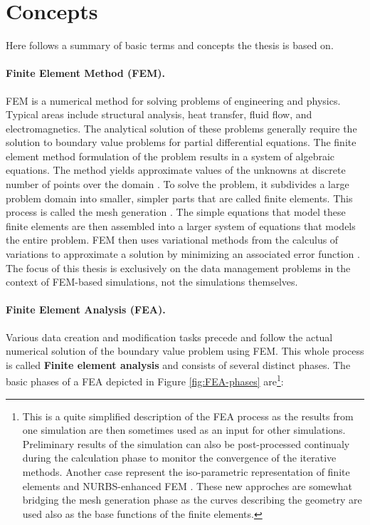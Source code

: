 \section{Concepts}

Here follows a summary of basic terms and concepts the thesis is based on.

\paragraph{Finite Element Method (FEM).} FEM is a numerical method for solving problems of engineering and physics. Typical areas include structural analysis, heat transfer, fluid flow, and electromagnetics. The analytical solution of these problems generally require the solution to boundary value problems for partial differential equations. The finite element method formulation of the problem results in a system of algebraic equations. The method yields approximate values of the unknowns at discrete number of points over the domain \cite{XXX}. To solve the problem, it subdivides a large problem domain into smaller, simpler parts that are called finite elements. This process is called the mesh generation \cite{XXX}. The simple equations that model these finite elements are then assembled into a larger system of equations that models the entire problem. FEM then uses variational methods from the calculus of variations to approximate a solution by minimizing an associated error function \cite{XXX}. The focus of this thesis is exclusively on the data management problems in the context of FEM-based simulations, not the simulations themselves.


\paragraph{Finite Element Analysis (FEA).} Various data creation and modification tasks precede and follow the actual numerical solution of the boundary value problem using FEM. This whole process is called \textbf{Finite element analysis} and consists of several distinct phases. The basic phases of a FEA depicted in Figure \ref{fig:FEA-phases} are\footnote{This is a quite simplified description of the FEA process as the results from one simulation are then sometimes used as an input for other simulations. Preliminary results of the simulation can also be post-processed continualy during the calculation phase to monitor the convergence of the iterative methods. Another case represent the iso-parametric representation of finite elements \cite{XXX} and NURBS-enhanced FEM \cite{XXX}. These new approches are somewhat bridging the mesh generation phase as the curves describing the geometry are used also as the base functions of the finite elements.}:

